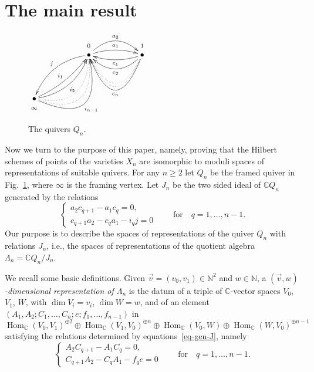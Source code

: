 \documentclass[pdftex]{sigma}
\numberwithin{equation}{section}
\begin{document}
\section{The main result}\label{sectionmainresult}

\begin{figure}[t]\centering
$ \xymatrix@R-2.3em{
&&\mbox{\scriptsize$0$}&&\mbox{\scriptsize$1$}\\
&&\bullet\ar@/_3ex/[llddddddd]_{j}\ar@/^/[rr]^{a_{1}}\ar@/^4ex/[rr]^{a_{2}}&&\bullet\ar@/^/[ll]^{c_{1}}
\ar@/^4ex/[ll]^{c_2}\ar@{..}@/^8ex/[ll]\ar@{..}@/^9ex/[ll]
\ar@/^10ex/[ll]^{c_{n}}& \\ \\ \\ \\ \\&&&&& \\ \\
\bullet\ar@/_/[rruuuuuuu]^{i_1}\ar@/_3ex/[rruuuuuuu]_{i_2}\ar@{..}@/_6ex/[rruuuuuuu]\ar@{..}@/_8ex/[rruuuuuuu]\ar@/_10ex/[rruuuuuuu]_{i_{n-1}}&&&&&\\
\mbox{\scriptsize$\infty$}&&&&
}
$
\caption{The quivers $Q_n$.}\label{Qn}
\end{figure}
Now we turn to the purpose of this paper, namely, proving that the Hilbert schemes of points of the varieties $X_n$ are
isomorphic to moduli spaces of representations of suitable quivers.
 For any $n\geq2$ let $Q_{n}$ be the framed quiver in Fig.~\ref{Qn}, where $\infty$ is the framing vertex. Let $J_{n}$ be the two sided ideal of $\mathbb{C} Q_{n}$ generated by the relations
\begin{equation}
\begin{cases}
a_2c_{q+1}-a_1c_q =0,\\
c_{q+1}a_2-c_qa_1-i_qj =0
\end{cases}
\qquad\text{for}\quad q=1,\dots,n-1 .
\label{eq-gen-J}
\end{equation}
Our purpose is to describe the spaces of representations of the quiver $Q_n$ with relations $J_{n}$, i.e., the spaces of representations of the quotient algebra $\Lambda_{n}=\mathbb{C} Q_{n}/J_{n}$.

We recall some basic definitions. Given $\vec{v} = (v_0, v_1)\in \mathbb{N}^2$ and $w\in \mathbb{N}$,
a {\it $(\vec{v},w)$-dimensional representation of $\Lambda_n$}
is the datum of a triple of $\mathbb{C}$-vector spaces $V_0$, $V_1$, $W$, with $\dim V_i = v_i$, $\dim W=w$, and of an element
$(A_1,A_2;C_1, \dots,C_n;e;f_1,\dots,f_{n-1})$ in
\[
\operatorname{Hom}_\mathbb{C}(V_0,V_1)^{\oplus2}\oplus\operatorname{Hom}_\mathbb{C}(V_1,V_0)^{\oplus n}\oplus\operatorname{Hom}_\mathbb{C}(V_0,W)\oplus\operatorname{Hom}_\mathbb{C}(W,V_0)^{\oplus n-1}
\]
 satisfying the relations determined by equations~\eqref{eq-gen-J}, namely
 \begin{equation}
\begin{cases}
A_2 C_{q+1}- A_1 C_q =0,\\
C_{q+1} A_2 - C_q A_1- f_q e =0
\end{cases}
\qquad\text{for}\quad q=1,\dots,n-1 .
\label{eq-gen-Q1}\tag{Q1}
\end{equation}
\end{document}
